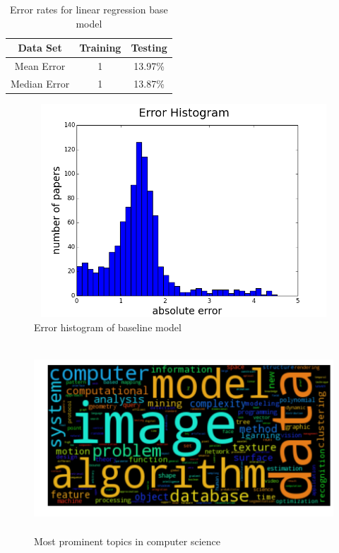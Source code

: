 \documentclass[a4paper, 11pt]{article}
\begin{document}
\begin{table}[h!]
\centering
\begin{tabular}{||c c c ||} 
 \hline
 Data Set & Training &  Testing \\ [0.5ex] 
 \hline\hline
 Mean Error &  1 & 13.97\% \\ [1ex] 
Median Error & 1  & 13.87\% \\ [1ex] 
 \hline
\end{tabular}
\caption{Error rates for linear regression base model}
\label{table:1}
\end{table}
\begin{figure}[h]
    \centering
    \includegraphics[width=17cm,height=8cm]{figure_1}
    \caption{Error histogram of baseline model}
    \label{fig:errorhistogram}
\end{figure}
\begin{figure}[h]
    \centering
    \includegraphics[width=16cm,height=7cm]{venue-image}
    \caption{Most prominent topics in computer science}
    \label{fig:venue}
\end{figure}
\end{document}
